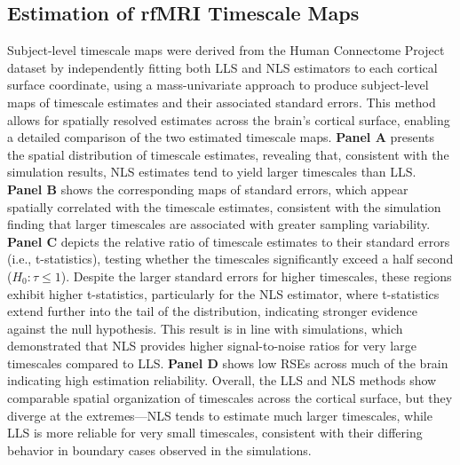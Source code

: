 \documentclass[latex/main.tex]{subfiles}
\begin{document}
\subsection{Estimation of rfMRI Timescale Maps}
Subject-level timescale maps were derived from the Human Connectome Project dataset by independently fitting both LLS and NLS estimators to each cortical surface coordinate, using a mass-univariate approach to produce subject-level maps of timescale estimates and their associated standard errors. This method allows for spatially resolved estimates across the brain's cortical surface, enabling a detailed comparison of the two estimated timescale maps. \textbf{Panel A} presents the spatial distribution of timescale estimates, revealing that, consistent with the simulation results, NLS estimates tend to yield larger timescales than LLS. \textbf{Panel B} shows the corresponding maps of standard errors, which appear spatially correlated with the timescale estimates, consistent with the simulation finding that larger timescales are associated with greater sampling variability. \textbf{Panel C} depicts the relative ratio of timescale estimates to their standard errors (i.e., t-statistics), testing whether the timescales significantly exceed a half second ($H_0: \tau \leq 1$). Despite the larger standard errors for higher timescales, these regions exhibit higher t-statistics, particularly for the NLS estimator, where t-statistics extend further into the tail of the distribution, indicating stronger evidence against the null hypothesis. This result is in line with simulations, which demonstrated that NLS provides higher signal-to-noise ratios for very large timescales compared to LLS. \textbf{Panel D} shows low RSEs across much of the brain indicating high estimation reliability. Overall, the LLS and NLS methods show comparable spatial organization of timescales across the cortical surface, but they diverge at the extremes—NLS tends to estimate much larger timescales, while LLS is more reliable for very small timescales, consistent with their differing behavior in boundary cases observed in the simulations.\\
\end{document}

